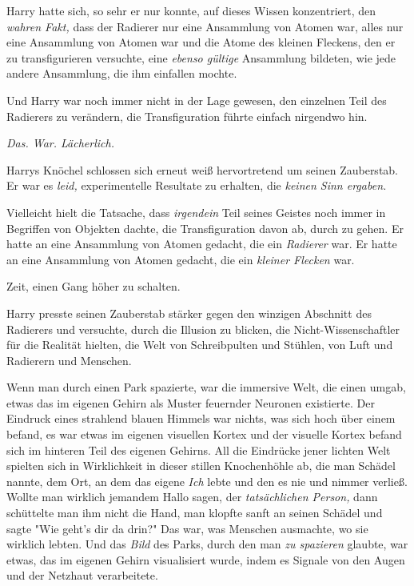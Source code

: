 {Harry hatte sich, so sehr er nur konnte, auf dieses Wissen konzentriert, den \emph{wahren Fakt,} dass der Radierer nur eine Ansammlung von Atomen war, alles nur eine Ansammlung von Atomen war und die Atome des kleinen Fleckens, den er zu transfigurieren versuchte, eine \emph{ebenso gültige} Ansammlung bildeten, wie jede andere Ansammlung, die ihm einfallen mochte.

Und Harry war noch immer nicht in der Lage gewesen, den einzelnen Teil des Radierers zu verändern, die Transfiguration führte einfach nirgendwo hin.

\emph{Das. War. Lächerlich.}

Harrys Knöchel schlossen sich erneut weiß hervortretend um seinen Zauberstab. Er war es \emph{leid,} experimentelle Resultate zu erhalten, die \emph{keinen Sinn ergaben.}

Vielleicht hielt die Tatsache, dass \emph{irgendein} Teil seines Geistes noch immer in Begriffen von Objekten dachte, die Transfiguration davon ab, durch zu gehen. Er hatte an eine Ansammlung von Atomen gedacht, die ein \emph{Radierer} war. Er hatte an eine Ansammlung von Atomen gedacht, die ein \emph{kleiner Flecken} war.

Zeit, einen Gang höher zu schalten.

Harry presste seinen Zauberstab stärker gegen den winzigen Abschnitt des Radierers und versuchte, durch die Illusion zu blicken, die Nicht-Wissenschaftler für die Realität hielten, die Welt von Schreibpulten und Stühlen, von Luft und Radierern und Menschen.

Wenn man durch einen Park spazierte, war die immersive Welt, die einen umgab, etwas das im eigenen Gehirn als Muster feuernder Neuronen existierte. Der Eindruck eines strahlend blauen Himmels war nichts, was sich hoch über einem befand, es war etwas im eigenen visuellen Kortex und der visuelle Kortex befand sich im hinteren Teil des eigenen Gehirns. All die Eindrücke jener lichten Welt spielten sich in Wirklichkeit in dieser stillen Knochenhöhle ab, die man Schädel nannte, dem Ort, an dem das eigene \emph{Ich} lebte und den es nie und nimmer verließ. Wollte man wirklich jemandem Hallo sagen, der \emph{tatsächlichen Person,} dann schüttelte man ihm nicht die Hand, man klopfte sanft an seinen Schädel und sagte "Wie geht's dir da drin?" Das war, was Menschen ausmachte, wo sie wirklich lebten. Und das \emph{Bild} des Parks, durch den man \emph{zu spazieren} glaubte, war etwas, das im eigenen Gehirn visualisiert wurde, indem es Signale von den Augen und der Netzhaut verarbeitete.

}
